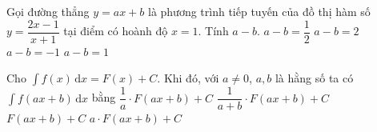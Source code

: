 \begin{ex}%
	Gọi đường thẳng $ y = ax + b  $ là phương trình tiếp tuyến của đồ thị hàm số $ y = \dfrac{2x -1}{x + 1} $ tại điểm có hoành độ $ x = 1 $.  Tính $ a - b $.
	\choice
	{ $ a - b = \dfrac{1}{2} $}
	{$ a - b = 2 $}
	{$ a - b = -1 $}
	{\True $ a - b = 1 $}
\end{ex}
\begin{ex}%
	Cho $ \displaystyle \int f(x) \mathrm{\, d} x = F(x) + C $. Khi đó, với $ a \neq 0 $, $ a, b $ là hằng số ta có $ \displaystyle \int f(ax + b) \mathrm{\, d} x  $ bằng
	\choice
	{\True $ \dfrac{1}{a } \cdot  F(ax + b ) + C $}
	{$ \dfrac{1}{a + b } \cdot  F(ax + b ) + C $}
	{$ F(ax + b ) + C $}
	{$ a \cdot F(ax + b ) + C $}
\end{ex}
